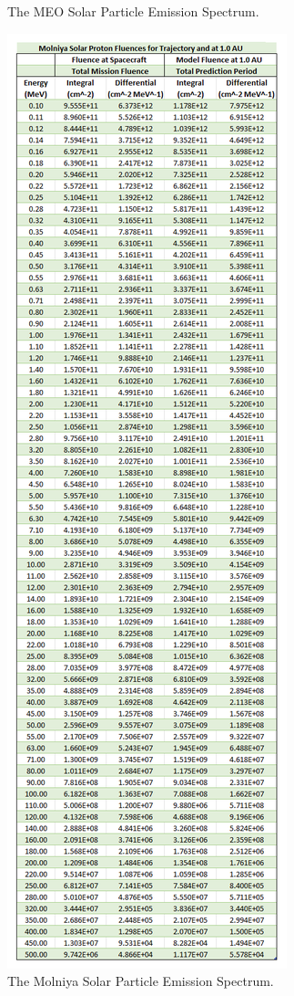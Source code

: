\documentclass[11pt]{article}
\begin{document}
\begin{figure}
\begin{minipage}{\dimexpr.5\textwidth-1em}
        \caption{The MEO Solar Particle Emission Spectrum.}
        \label{fig:OHBMEOSP}
    \end{minipage}\hfill
    \begin{minipage}{\dimexpr.5\textwidth-1em}
        \centering
        \includegraphics[width=0.78\linewidth]{Molniya_SP.png}
        \caption{The Molniya Solar Particle Emission Spectrum.}
        \label{fig:MolniyaSP}
    \end{minipage}
\end{figure}
\end{document}
